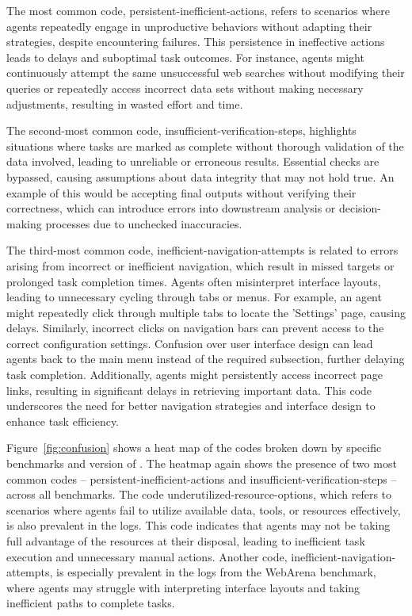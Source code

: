 The most common code, persistent-inefficient-actions, refers to scenarios where agents repeatedly engage in unproductive behaviors without adapting their strategies, despite encountering failures. This persistence in ineffective actions leads to delays and suboptimal task outcomes. For instance, agents might continuously attempt the same unsuccessful web searches without modifying their queries or repeatedly access incorrect data sets without making necessary adjustments, resulting in wasted effort and time.

The second-most common code, insufficient-verification-steps, highlights situations where tasks are marked as complete without thorough validation of the data involved, leading to unreliable or erroneous results. Essential checks are bypassed, causing assumptions about data integrity that may not hold true. An example of this would be accepting final outputs without verifying their correctness, which can introduce errors into downstream analysis or decision-making processes due to unchecked inaccuracies.

The third-most common code, inefficient-navigation-attempts is related to errors arising from incorrect or inefficient navigation, which result in missed targets or prolonged task completion times. Agents often misinterpret interface layouts, leading to unnecessary cycling through tabs or menus. For example, an agent might repeatedly click through multiple tabs to locate the 'Settings' page, causing delays. Similarly, incorrect clicks on navigation bars can prevent access to the correct configuration settings. Confusion over user interface design can lead agents back to the main menu instead of the required subsection, further delaying task completion. Additionally, agents might persistently access incorrect page links, resulting in significant delays in retrieving important data. This code underscores the need for better navigation strategies and interface design to enhance task efficiency.

Figure~\ref{fig:confusion} shows a heat map of the codes broken down by specific benchmarks and version of \team. The heatmap again shows the presence of two most common codes -- persistent-inefficient-actions and insufficient-verification-steps -- across all benchmarks. The code underutilized-resource-options, which refers to scenarios where agents fail to utilize available data, tools, or resources effectively, is also prevalent in the logs. This code indicates that agents may not be taking full advantage of the resources at their disposal, leading to inefficient task execution and unnecessary manual actions. Another code, inefficient-navigation-attempts, is especially prevalent in the logs from the WebArena benchmark, where agents may struggle with interpreting interface layouts and taking inefficient paths to complete tasks.

